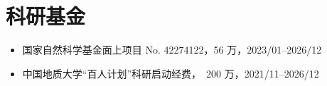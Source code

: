 \section{科研基金}

\begin{itemize}
\item 国家自然科学基金面上项目 No. 42274122，56 万，2023/01--2026/12
\item 中国地质大学“百人计划”科研启动经费，\textyen\ 200 万，2021/11--2026/12
\end{itemize}
